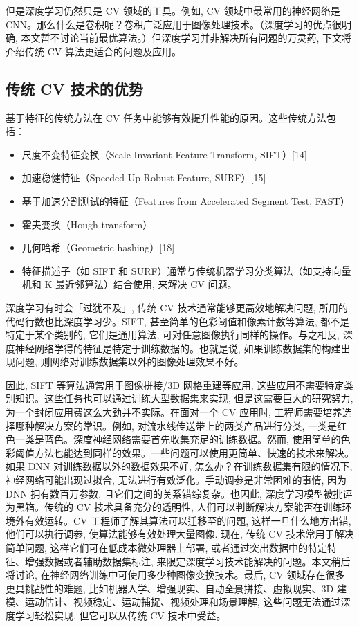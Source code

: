 但是深度学习仍然只是 CV 领域的工具。例如, CV 领域中最常用的神经网络是 CNN。那么什么是卷积呢？卷积广泛应用于图像处理技术。（深度学习的优点很明确, 本文暂不讨论当前最优算法。）但深度学习并非解决所有问题的万灵药, 下文将介绍传统 CV 算法更适合的问题及应用。
\subsection{传统 CV 技术的优势}

基于特征的传统方法在 CV 任务中能够有效提升性能的原因。这些传统方法包括：
\begin{itemize}
\item 尺度不变特征变换（Scale Invariant Feature Transform, SIFT）[14]
\item 加速稳健特征（Speeded Up Robust Feature, SURF）[15]
\item 基于加速分割测试的特征（Features from Accelerated Segment Test, FAST）\cite{Rosten2006}
\item 霍夫变换（Hough transform）\cite{Goldenshluger2004}
\item 几何哈希（Geometric hashing）[18]
\item 特征描述子（如 SIFT 和 SURF）通常与传统机器学习分类算法（如支持向量机和 K 最近邻算法）结合使用, 来解决 CV 问题。
\end{itemize}

深度学习有时会「过犹不及」, 传统 CV 技术通常能够更高效地解决问题, 所用的代码行数也比深度学习少。SIFT, 甚至简单的色彩阈值和像素计数等算法, 都不是特定于某个类别的, 它们是通用算法, 可对任意图像执行同样的操作。与之相反, 深度神经网络学得的特征是特定于训练数据的。也就是说, 如果训练数据集的构建出现问题, 则网络对训练数据集以外的图像处理效果不好。

因此, SIFT 等算法通常用于图像拼接/3D 网格重建等应用, 这些应用不需要特定类别知识。这些任务也可以通过训练大型数据集来实现, 但是这需要巨大的研究努力, 为一个封闭应用费这么大劲并不实际。在面对一个 CV 应用时, 工程师需要培养选择哪种解决方案的常识。例如, 对流水线传送带上的两类产品进行分类, 一类是红色一类是蓝色。深度神经网络需要首先收集充足的训练数据。然而, 使用简单的色彩阈值方法也能达到同样的效果。一些问题可以使用更简单、快速的技术来解决。
如果 DNN 对训练数据以外的数据效果不好, 怎么办？在训练数据集有限的情况下, 神经网络可能出现过拟合, 无法进行有效泛化。手动调参是非常困难的事情, 因为 DNN 拥有数百万参数, 且它们之间的关系错综复杂。也因此, 深度学习模型被批评为黑箱。传统的 CV 技术具备充分的透明性, 人们可以判断解决方案能否在训练环境外有效运转。CV 工程师了解其算法可以迁移至的问题, 这样一旦什么地方出错, 他们可以执行调参, 使算法能够有效处理大量图像.
现在, 传统 CV 技术常用于解决简单问题, 这样它们可在低成本微处理器上部署, 或者通过突出数据中的特定特征、增强数据或者辅助数据集标注, 来限定深度学习技术能解决的问题。本文稍后将讨论, 在神经网络训练中可使用多少种图像变换技术。最后, CV 领域存在很多更具挑战性的难题, 比如机器人学、增强现实、自动全景拼接、虚拟现实、3D 建模、运动估计、视频稳定、运动捕捉、视频处理和场景理解, 这些问题无法通过深度学习轻松实现, 但它可以从传统 CV 技术中受益。

